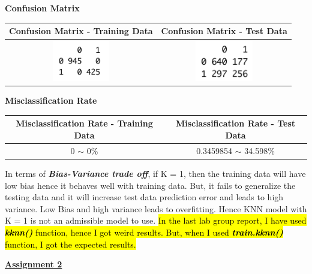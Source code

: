 \documentclass[a4paper,10pt]{article}
\begin{document}
\begin{center}
	\textbf{Confusion Matrix} \par
	\begin{tabular}{|c|c|}
		\hline
		Confusion Matrix - Training Data&
		Confusion Matrix - Test Data\\
		\hline
		\cellcolor{yellow!100} \includegraphics[width=25mm,scale=0.10]{Confusion_Matrix_knn_training_Data_2.png} &
		\cellcolor{yellow!100} \includegraphics[width=25mm,scale=0.10]{Confusion_Matrix_knn_test_Data_2.png}\\
		\hline
	\end{tabular}\par \par
	\textbf{Misclassification Rate} \par
	\begin{tabular}{|c|c|}
		\hline
		Misclassification Rate - Training Data&
		Misclassification Rate - Test Data\\
		\hline
		\cellcolor{yellow!100} 0 $\sim$ 0\% & \cellcolor{yellow!100} 0.3459854 $\sim$ 34.598\%\\
		\hline
	\end{tabular}\par
\end{center}
In terms of \textit{\textbf{Bias-Variance trade off}}, if K = 1, then the training data will have low bias hence it behaves
well with training data. But, it fails to generalize the testing data and it will increase test data prediction error and 
leads to high variance. Low Bias and high variance leads to overfitting. Hence KNN model with K = 1 is not an admissible
model to use. \hl{In the last lab group report, I have used \textbf{\textit{kknn()}} function, hence I got weird results. But,
when I used \textbf{\textit{train.kknn()}} function, I got the expected results.}
\par
\newpage
\textbf{\underline{Assignment 2}} \par
\end{document}
